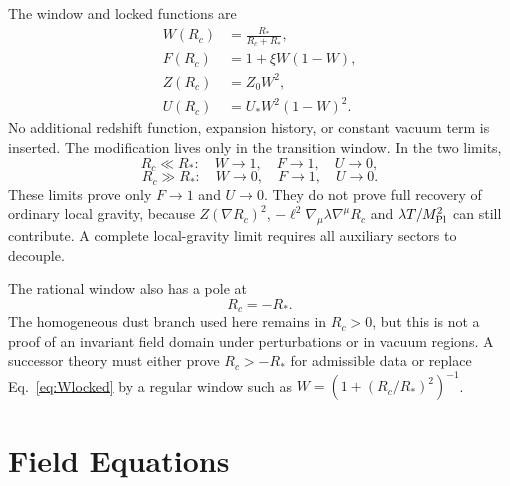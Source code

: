 \documentclass[12pt,a4paper]{article}
\begin{document}
The window and locked functions are
\begin{align}
W(R_c)&=\frac{R_*}{R_c+R_*},\label{eq:Wlocked}\\
F(R_c)&=1+\xi W(1-W),\label{eq:Flocked}\\
Z(R_c)&=Z_0W^2,\label{eq:Zlocked}\\
U(R_c)&=U_*W^2(1-W)^2.\label{eq:Ulocked}
\end{align}
No additional redshift function, expansion history, or constant vacuum term is inserted. The modification lives only in the transition window. In the two limits,
\begin{equation}
R_c\ll R_*:\quad W\to1,\quad F\to1,\quad U\to0,
\end{equation}
\begin{equation}
R_c\gg R_*:\quad W\to0,\quad F\to1,\quad U\to0.
\end{equation}
These limits prove only $F\to1$ and $U\to0$. They do not prove full recovery of ordinary local gravity, because $Z(\nabla R_c)^2$, $-\ell^2\nabla_\mu\lambda\nabla^\mu R_c$ and $\lambda T/M_{\rm Pl}^2$ can still contribute. A complete local-gravity limit requires all auxiliary sectors to decouple.

The rational window also has a pole at
\begin{equation}
R_c=-R_*.
\label{eq:window-pole}
\end{equation}
The homogeneous dust branch used here remains in $R_c>0$, but this is not a proof of an invariant field domain under perturbations or in vacuum regions. A successor theory must either prove $R_c>-R_*$ for admissible data or replace Eq.~\eqref{eq:Wlocked} by a regular window such as $W=(1+(R_c/R_*)^2)^{-1}$.

\section{Field Equations}
\end{document}
